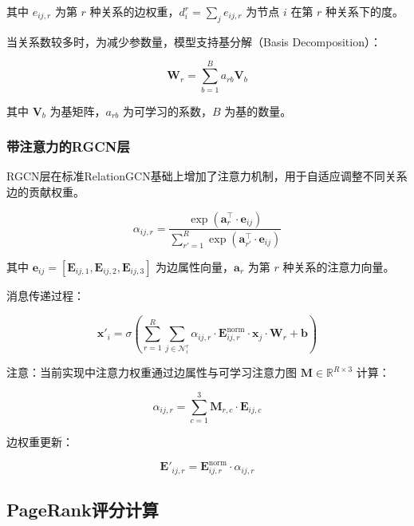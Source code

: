 \documentclass[UTF8, a4paper, 12pt]{article}
\begin{document}
其中 $e_{ij,r}$ 为第 $r$ 种关系的边权重，$d_i^r = \sum_j e_{ij,r}$ 为节点 $i$ 在第 $r$ 种关系下的度。

当关系数较多时，为减少参数量，模型支持基分解（Basis Decomposition）：

\begin{equation}
\mathbf{W}_r = \sum_{b=1}^{B} a_{rb} \mathbf{V}_b
\end{equation}

其中 $\mathbf{V}_b$ 为基矩阵，$a_{rb}$ 为可学习的系数，$B$ 为基的数量。

\subsubsection{带注意力的RGCN层}

RGCN层在标准RelationGCN基础上增加了注意力机制，用于自适应调整不同关系边的贡献权重。

\begin{equation}
\alpha_{ij,r} = \frac{\exp\left(\mathbf{a}_r^{\top} \cdot \mathbf{e}_{ij}\right)}{\sum_{r'=1}^{R} \exp\left(\mathbf{a}_{r'}^{\top} \cdot \mathbf{e}_{ij}\right)}
\end{equation}

其中 $\mathbf{e}_{ij} = [\mathbf{E}_{ij,1}, \mathbf{E}_{ij,2}, \mathbf{E}_{ij,3}]$ 为边属性向量，$\mathbf{a}_r$ 为第 $r$ 种关系的注意力向量。

消息传递过程：

\begin{equation}
\mathbf{x}'_i = \sigma\left( \sum_{r=1}^{R} \sum_{j \in \mathcal{N}_i^r} \alpha_{ij,r} \cdot \mathbf{E}_{ij,r}^{\text{norm}} \cdot \mathbf{x}_j \cdot \mathbf{W}_r + \mathbf{b} \right)
\end{equation}

注意：当前实现中注意力权重通过边属性与可学习注意力图 $\mathbf{M} \in \mathbb{R}^{R \times 3}$ 计算：

\begin{equation}
\alpha_{ij,r} = \sum_{c=1}^{3} \mathbf{M}_{r,c} \cdot \mathbf{E}_{ij,c}
\end{equation}

边权重更新：

\begin{equation}
\mathbf{E}'_{ij,r} = \mathbf{E}_{ij,r}^{\text{norm}} \cdot \alpha_{ij,r}
\end{equation}

\subsection{PageRank评分计算}
\end{document}
